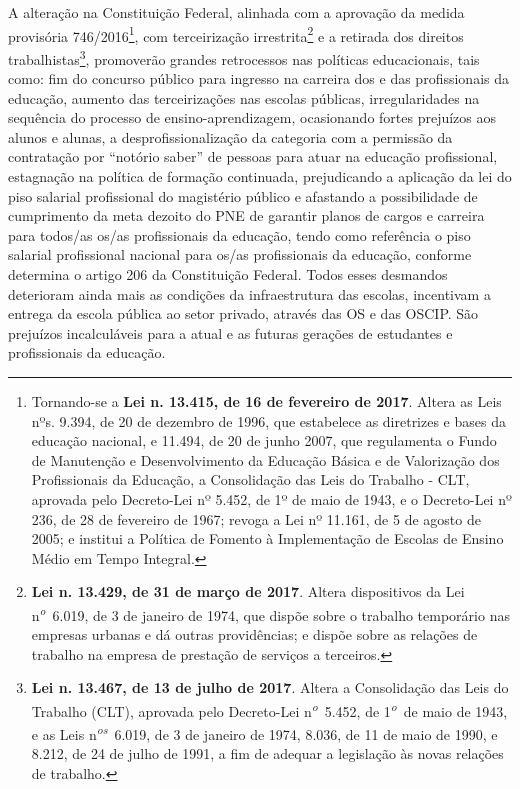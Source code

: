A alteração na Constituição Federal, alinhada com a aprovação da medida
provisória 746/2016\footnote{Tornando-se a \textbf{Lei n. 13.415, de 16
  de fevereiro de 2017}. Altera as Leis nºs. 9.394, de 20 de dezembro de
  1996, que estabelece as diretrizes e bases da educação nacional, e
  11.494, de 20 de junho 2007, que regulamenta o Fundo de Manutenção e
  Desenvolvimento da Educação Básica e de Valorização dos Profissionais
  da Educação, a Consolidação das Leis do Trabalho - CLT, aprovada pelo
  Decreto-Lei nº 5.452, de 1º de maio de 1943, e o Decreto-Lei nº 236,
  de 28 de fevereiro de 1967; revoga a Lei nº 11.161, de 5 de agosto de
  2005; e institui a Política de Fomento à Implementação de Escolas de
  Ensino Médio em Tempo Integral.}, com terceirização
irrestrita\footnote{\textbf{Lei n. 13.429, de 31 de março de 2017}.
  Altera dispositivos da Lei n\textsuperscript{\emph{o}}~6.019, de 3 de
  janeiro de 1974, que dispõe sobre o trabalho temporário nas empresas
  urbanas e dá outras providências; e dispõe sobre as relações de
  trabalho na empresa de prestação de serviços a terceiros.} e a
retirada dos direitos trabalhistas\footnote{\textbf{Lei n. 13.467, de 13
  de julho de 2017}. Altera a Consolidação das Leis do Trabalho (CLT),
  aprovada pelo Decreto-Lei n\textsuperscript{\emph{o}}~5.452, de
  1\textsuperscript{\emph{o}}~de maio de 1943, e as Leis
  n\textsuperscript{\emph{os}}~6.019, de 3 de janeiro de 1974, 8.036, de
  11 de maio de 1990, e 8.212, de 24 de julho de 1991, a fim de adequar
  a legislação às novas relações de trabalho.}, promoverão grandes
retrocessos nas políticas educacionais, tais como: fim do concurso
público para ingresso na carreira dos e das profissionais da educação,
aumento das terceirizações nas escolas públicas, irregularidades na
sequência do processo de ensino-aprendizagem, ocasionando fortes
prejuízos aos alunos e alunas, a desprofissionalização da categoria com
a permissão da contratação por ``notório saber'' de pessoas para atuar
na educação profissional, estagnação na política de formação continuada,
prejudicando a aplicação da lei do piso salarial profissional do
magistério público e afastando a possibilidade de cumprimento da meta
dezoito do PNE de garantir planos de cargos e carreira para todos/as
os/as profissionais da educação, tendo como referência o piso salarial
profissional nacional para os/as profissionais da educação, conforme
determina o artigo 206 da Constituição Federal. Todos esses desmandos
deterioram ainda mais as condições da infraestrutura das escolas,
incentivam a entrega da escola pública ao setor privado, através das OS
e das OSCIP. São prejuízos incalculáveis para a atual e as futuras
gerações de estudantes e profissionais da educação.

